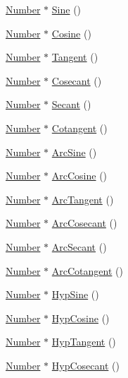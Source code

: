 \begin{DoxyCompactItemize}
\hyperlink{structNumber}{Number} $\ast$ \hyperlink{structComplexNumber_a5125e77b2c28147688cf65f596c9ccb7}{Sine} ()
\item 
\hyperlink{structNumber}{Number} $\ast$ \hyperlink{structComplexNumber_a9c52151f9a5111bf5163f43e5e697f9e}{Cosine} ()
\item 
\hyperlink{structNumber}{Number} $\ast$ \hyperlink{structComplexNumber_a6b7cb0a68c9d44e3367c9a42748af045}{Tangent} ()
\item 
\hyperlink{structNumber}{Number} $\ast$ \hyperlink{structComplexNumber_a9740a470743b92208243140c3f7a8b35}{Cosecant} ()
\item 
\hyperlink{structNumber}{Number} $\ast$ \hyperlink{structComplexNumber_a214e1ed3096e8ed3aa0a3c446fe2ef8a}{Secant} ()
\item 
\hyperlink{structNumber}{Number} $\ast$ \hyperlink{structComplexNumber_a922c244a14dbee2e17bd5dc6dbec7625}{Cotangent} ()
\item 
\hyperlink{structNumber}{Number} $\ast$ \hyperlink{structComplexNumber_ab52b2cfd9cd0ba862346408c580e385c}{Arc\+Sine} ()
\item 
\hyperlink{structNumber}{Number} $\ast$ \hyperlink{structComplexNumber_a5f9bdc56dba5fc8cdf8afb8cd232e7e4}{Arc\+Cosine} ()
\item 
\hyperlink{structNumber}{Number} $\ast$ \hyperlink{structComplexNumber_a69dc018433e7409d5b6b6d87568ae232}{Arc\+Tangent} ()
\item 
\hyperlink{structNumber}{Number} $\ast$ \hyperlink{structComplexNumber_a904a9af5470b037c1931d7d090410c94}{Arc\+Cosecant} ()
\item 
\hyperlink{structNumber}{Number} $\ast$ \hyperlink{structComplexNumber_a66cb3904e4b3127f0e3714ba23a0c981}{Arc\+Secant} ()
\item 
\hyperlink{structNumber}{Number} $\ast$ \hyperlink{structComplexNumber_a412a4480826c808d9358ccc84f24a75f}{Arc\+Cotangent} ()
\item 
\hyperlink{structNumber}{Number} $\ast$ \hyperlink{structComplexNumber_a800a3cce573a4952ffdc61591ef781cc}{Hyp\+Sine} ()
\item 
\hyperlink{structNumber}{Number} $\ast$ \hyperlink{structComplexNumber_a3de3278838400b94d6da3aabc264e467}{Hyp\+Cosine} ()
\item 
\hyperlink{structNumber}{Number} $\ast$ \hyperlink{structComplexNumber_a313bade9f3fdc7171f907c9fbafa06a0}{Hyp\+Tangent} ()
\item 
\hyperlink{structNumber}{Number} $\ast$ \hyperlink{structComplexNumber_ab4ee0dc45e8e43e1fa647bef6c65542c}{Hyp\+Cosecant} ()

\end{DoxyCompactItemize}
